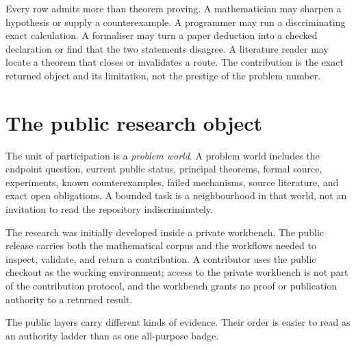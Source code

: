 \documentclass[10pt]{article}
\begin{document}
Every row admits more than theorem proving.  A mathematician may sharpen a
hypothesis or supply a counterexample.  A programmer may run a discriminating
exact calculation.  A formaliser may turn a paper deduction into a checked
declaration or find that the two statements disagree.  A literature reader
may locate a theorem that closes or invalidates a route.  The contribution is
the exact returned object and its limitation, not the prestige of the problem
number.

\section{The public research object}\label{sec:object}

The unit of participation is a \emph{problem world}.  A problem world includes
the endpoint question, current public status, principal theorems, formal
source, experiments, known counterexamples, failed mechanisms, source
literature, and exact open obligations.  A bounded task is a neighbourhood in
that world, not an invitation to read the repository indiscriminately.

The research was initially developed inside a private workbench.  The public
release carries both the mathematical corpus and the workflows needed to
inspect, validate, and return a contribution.  A contributor uses the public
checkout as the working environment; access to the private workbench is not
part of the contribution protocol, and the workbench grants no proof or
publication authority to a returned result.

The public layers carry different kinds of evidence.  Their order is easier to
read as an authority ladder than as one all-purpose badge.
\end{document}
